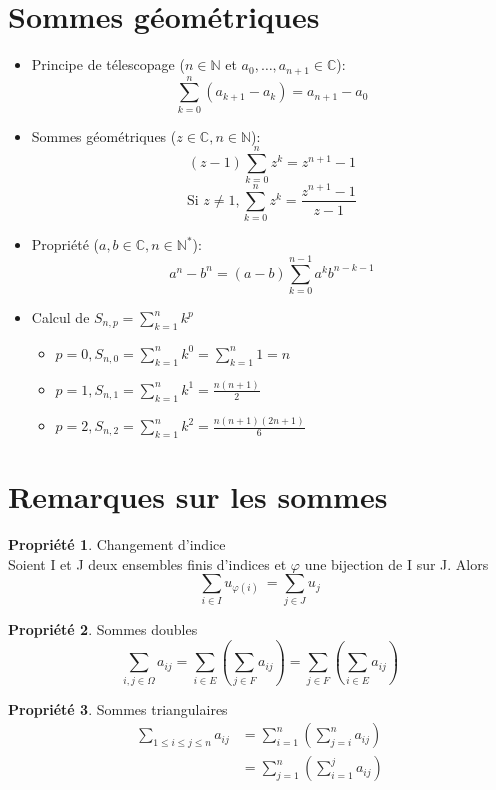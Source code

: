 \documentclass[fleqn]{article}
\theoremstyle{definition} \newtheorem*{defi}{D\'efinition}
\theoremstyle{definition} \newtheorem*{theo}{Th\'eor\`eme}
\theoremstyle{definition} \newtheorem*{prop}{Propri\'et\'e}
\begin{document}
\section{Sommes g\'eom\'etriques}
\begin{itemize}
	\item Principe de t\'elescopage (\(n \in \mathbb{N}\) et \(a_0, \hdots, a_{n+1} \in \mathbb{C}\)):
		\[\sum_{k=0}^{n} (a_{k+1} - a_k) = a_{n+1} - a_0\]
	\item Sommes g\'eom\'etriques (\(z \in \mathbb{C}, n \in \mathbb{N}\)):
		\[(z-1)\sum_{k=0}^{n}z^k = z^{n+1} -1\]
		\[\text{Si } z \neq 1, \sum_{k=0}^{n}z^k=\frac{z^{n+1}-1}{z-1}\]
	\item Propri\'{e}t\'{e} (\(a,b \in \mathbb{C}, n \in \mathbb{N}^*\)):
		\[a^n-b^n = (a-b)\sum_{k=0}^{n-1}a^kb^{n-k-1}\]
	\item Calcul de \(S_{n,p} = \sum_{k=1}^{n}k^p\)
		\begin{itemize}
			\item \(p = 0, S_{n,0} = \sum_{k=1}^{n}k^0 = \sum_{k=1}^{n}1 = n\)
			\item \(p = 1, S_{n,1} = \sum_{k=1}^{n}k^1 = \frac{n(n+1)}{2} \)
			\item \(p = 2, S_{n,2} = \sum_{k=1}^{n}k^2 = \frac{n(n+1)(2n+1)}{6} \)
		\end{itemize}
\end{itemize}

\section{Remarques sur les sommes}
\begin{prop} Changement d'indice\\
	Soient I et J deux ensembles finis d'indices et $\varphi$ une bijection de I sur J. Alors
	\[\underset{i \in I}{\sum} u_{\varphi(i)}\ = \underset{j \in J}{\sum} u_j\]
\end{prop}

\begin{prop} Sommes doubles
	\[\underset{i,j\in \Omega}{\sum} a_{ij} = \underset{i \in E}{\sum}\left(\underset{j \in F}{\sum}a_{ij}\right) = 
	\underset{j \in F}{\sum}\left(\underset{i \in E}{\sum}a_{ij}\right)\]
\end{prop}

\begin{prop} Sommes triangulaires
	\begin{align*}
	\underset{1 \leq i \leq j \leq n}{\sum} a_{ij} &= \sum_{i=1}^{n}\left(\sum_{j = i}^n a_{ij}\right) \\
	&= \sum_{j=1}^{n}\left(\sum_{i = 1}^j a_{ij}\right)
	\end{align*}
\end{prop}
\end{document}
